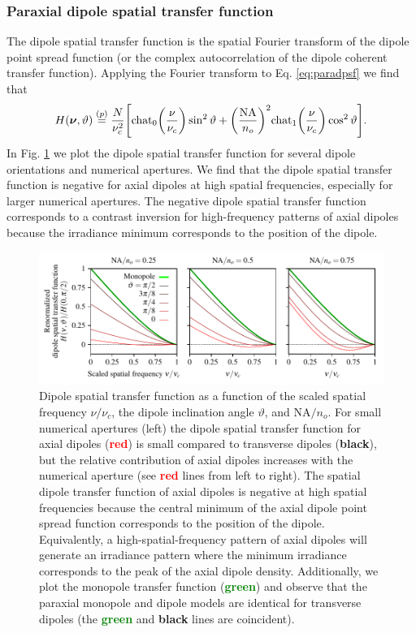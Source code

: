 \documentclass[]{osa-article}
\let\originalleft\left
\let\originalright\right
\renewcommand{\left}{\mathopen{}\mathclose\bgroup\originalleft}
\renewcommand{\right}{\aftergroup\egroup\originalright}
\providecommand{\bs}[1]{\boldsymbol{#1}}
\begin{document}
\subsubsection{Paraxial dipole spatial transfer function}\label{sec:trans}
The dipole spatial transfer function is the spatial Fourier transform of
the dipole point spread function (or the complex autocorrelation of the dipole
coherent transfer function). Applying the Fourier transform to Eq.
\eqref{eq:paradpsf} we find that
  \begin{align}
    H(\bs{\nu}, \vartheta) \stackrel{(p)}{=} \frac{N}{\nu_c^2}\left[\text{chat}_0\left(\frac{\nu}{\nu_c}\right)\sin^2\vartheta + \left(\frac{\text{NA}}{n_o}\right)^2 \text{chat}_1\left(\frac{\nu}{\nu_c}\right)\cos^2\vartheta\right].
  \end{align}
In Fig. \ref{fig:odotf} we plot the dipole spatial transfer function for
several dipole orientations and numerical apertures. We find that the dipole
spatial transfer function is negative for axial dipoles at high spatial
frequencies, especially for larger numerical apertures. The negative dipole
spatial transfer function corresponds to a contrast inversion for high-frequency
patterns of axial dipoles because the irradiance minimum corresponds to the
position of the dipole.

\begin{figure}[ht]
 \centering
   \centering
   \includegraphics[scale=0.8]{../figures/paratfs/sdtf.pdf}
   \caption{Dipole spatial transfer function as a function of the scaled spatial
     frequency $\nu/\nu_c$, the dipole inclination angle $\vartheta$, and
     $\text{NA}/n_o$. For small numerical apertures (left) the dipole spatial
     transfer function for axial dipoles (\textcolor{red}{\textbf{red}}) is
     small compared to transverse dipoles (\textbf{black}), but the relative
     contribution of axial dipoles increases with the numerical aperture (see
     \textcolor{red}{\textbf{red}} lines from left to right). The spatial dipole
     transfer function of axial dipoles is negative at high spatial frequencies
     because the central minimum of the axial dipole point spread function
     corresponds to the position of the dipole. Equivalently, a
     high-spatial-frequency pattern of axial dipoles will generate an irradiance
     pattern where the minimum irradiance corresponds to the peak of the axial
     dipole density. Additionally, we plot the monopole transfer function
     (\textcolor{green}{\textbf{green}}) and observe that the paraxial monopole
     and dipole models are identical for transverse dipoles (the
     \textcolor{green}{\textbf{green}} and \textbf{black} lines are
     coincident).}
   \label{fig:odotf}
 \end{figure}
\end{document}
